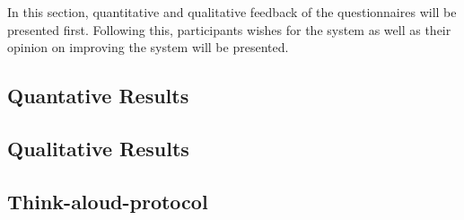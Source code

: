 In this section, quantitative and qualitative feedback of the questionnaires will be presented first.
Following this, participants wishes for the system as well as their opinion on improving the system will be presented.

\subsection{\label{sec::QuantativeResults}Quantative Results}

\subsection{\label{sec::QualitativeResults}Qualitative Results}

\subsection{\label{sec::ThinkAloudProtocol}Think-aloud-protocol}
